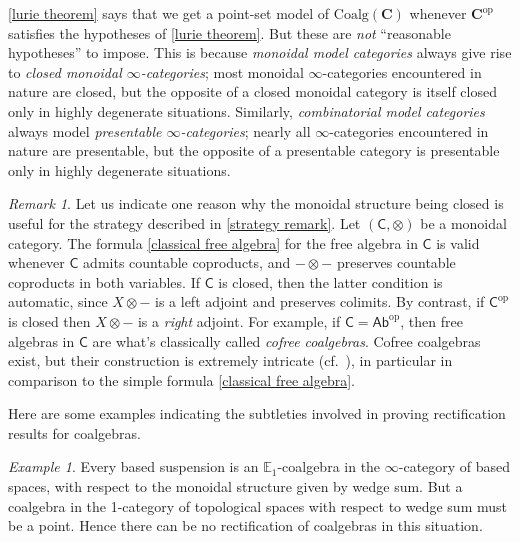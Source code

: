 \documentclass{proc-l}
\theoremstyle{plain}
\theoremstyle{definition}
\theoremstyle{remark}
\newtheorem{remark}[{theorem}]{Remark}
\newtheorem{example}[{theorem}]{Example}
\begin{document}
\cref{lurie theorem} says that we get a point-set model of $\mathrm{Coalg}(\mathbf C)$ whenever $\mathbf C^{\mathrm{op}}$ satisfies the hypotheses of \cref{lurie theorem}. But these are \emph{not} ``reasonable hypotheses'' to impose. This is because \emph{monoidal model categories} always give rise to \emph{closed monoidal $\infty$-categories}; most monoidal $\infty$-categories encountered in nature are closed, but the opposite of a closed monoidal category is  itself closed only in highly degenerate situations.  Similarly, \emph{combinatorial model categories} always model \emph{presentable $\infty$-categories}; nearly all  $\infty$-categories encountered in nature are presentable, but the opposite of a presentable category is  presentable only in highly degenerate situations.

\begin{remark}%
\label{Remark:1.4}\label{cofree are complicated}Let us indicate one reason why the monoidal structure being closed is useful for the strategy described in \cref{strategy remark}. Let $(\mathsf C,\otimes)$ be a monoidal category. The formula \eqref{classical free algebra} for the free algebra in $\mathsf C$ is valid whenever $\mathsf C$ admits countable coproducts, and $-\otimes-$ preserves countable coproducts in both variables. If $\mathsf C$ is closed, then the latter condition is automatic, since $X \otimes -$ is a left adjoint and preserves colimits. By contrast, if $\mathsf C^{\mathrm{op}}$ is closed then $X \otimes -$ is a \emph{right} adjoint. For example, if $\mathsf C = \mathsf{Ab}^{\mathrm{op}}$, then free algebras in $\mathsf C$ are what's classically called \emph{cofree coalgebras}. Cofree coalgebras exist, but their construction is extremely intricate (cf.~\cite{fox,Hazewinkel03}), in particular in comparison to the simple formula \eqref{classical free algebra}.

\end{remark}

Here are some examples indicating the subtleties involved in proving rectification results for coalgebras.

\begin{example}%
\label{Example:1.5}Every based suspension is an $\mathbb E_1$-coalgebra in the $\infty$-category of based spaces, with respect to the monoidal structure given by wedge sum. But a coalgebra in the 1-category of topological spaces with respect to wedge sum must be a point. Hence there can be no rectification of coalgebras in this situation.
\end{example}
\end{document}
